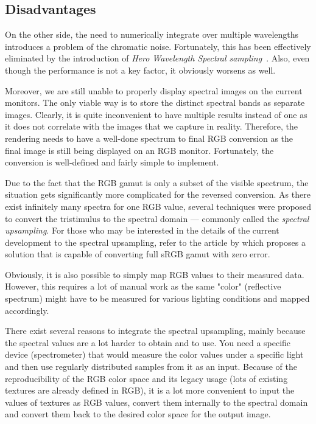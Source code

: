 \subsection{Disadvantages}

On the other side, the need to numerically integrate over multiple wavelengths introduces a problem of the chromatic noise. Fortunately, this has been effectively eliminated by the introduction of \emph{Hero Wavelength Spectral sampling}~\cite{wilkie2014hero}. Also, even though the performance is not a key factor, it obviously worsens as well. 

Moreover, we are still unable to properly display spectral images on the current monitors. The only viable way is to store the distinct spectral bands as separate images. Clearly, it is quite inconvenient to have multiple results instead of one as it does not correlate with the images that we capture in reality. Therefore, the rendering needs to have a well-done spectrum to final RGB conversion as the final image is still being displayed on an RGB monitor. Fortunately, the conversion is well-defined and fairly simple to implement.

Due to the fact that the RGB gamut is only a subset of the visible spectrum, the situation gets significantly more complicated for the reversed conversion. As there exist infinitely many spectra for one RGB value, several techniques were proposed to convert the tristimulus to the spectral domain --- commonly called the \emph{spectral upsampling}. For those who may be interested in the details of the current development to the spectral upsampling, refer to the article by \citet{jakob2019low} which proposes a solution that is capable of converting full sRGB gamut with zero error.

Obviously, it is also possible to simply map RGB values to their measured data. However, this requires a lot of manual work as the same "color" (reflective spectrum) might have to be measured for various lighting conditions and mapped accordingly.

There exist several reasons to integrate the spectral upsampling, mainly because the spectral values are a lot harder to obtain and to use. You need a specific device (spectrometer) that would measure the color values under a specific light and then use regularly distributed samples from it as an input. Because of the reproducibility of the RGB color space and its legacy usage (lots of existing textures are already defined in RGB), it is a lot more convenient to input the values of textures as RGB values, convert them internally to the spectral domain and convert them back to the desired color space for the output image.
